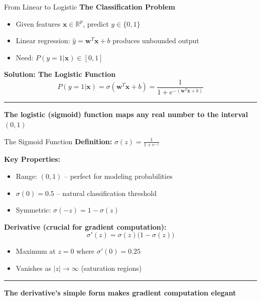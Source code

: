 \documentclass[8pt,aspectratio=169]{beamer}
\newcommand{\bottomnote}[1]{%
\vfill
\vspace{-2mm}
\textcolor{mllavender2}{\rule{\textwidth}{0.4pt}}
\vspace{1mm}
\footnotesize
\textbf{#1}
}
\begin{document}
\begin{frame}[t]{From Linear to Logistic}
\textbf{The Classification Problem}
\begin{itemize}
\item Given features $\mathbf{x} \in \mathbb{R}^p$, predict $y \in \{0, 1\}$
\item Linear regression: $\hat{y} = \mathbf{w}^T\mathbf{x} + b$ produces unbounded output
\item Need: $P(y=1|\mathbf{x}) \in [0, 1]$
\end{itemize}
\vspace{0.5em}
\textbf{Solution: The Logistic Function}
$$P(y=1|\mathbf{x}) = \sigma(\mathbf{w}^T\mathbf{x} + b) = \frac{1}{1 + e^{-(\mathbf{w}^T\mathbf{x} + b)}}$$
\bottomnote{The logistic (sigmoid) function maps any real number to the interval $(0,1)$}
\end{frame}

\begin{frame}[t]{The Sigmoid Function}
\textbf{Definition:} $\sigma(z) = \frac{1}{1 + e^{-z}}$

\vspace{0.5em}
\textbf{Key Properties:}
\begin{itemize}
\item Range: $(0, 1)$ -- perfect for modeling probabilities
\item $\sigma(0) = 0.5$ -- natural classification threshold
\item Symmetric: $\sigma(-z) = 1 - \sigma(z)$
\end{itemize}
\vspace{0.5em}
\textbf{Derivative (crucial for gradient computation):}
$$\sigma'(z) = \sigma(z)\bigl(1 - \sigma(z)\bigr)$$
\begin{itemize}
\item Maximum at $z = 0$ where $\sigma'(0) = 0.25$
\item Vanishes as $|z| \to \infty$ (saturation regions)
\end{itemize}
\bottomnote{The derivative's simple form makes gradient computation elegant}
\end{frame}
\end{document}
